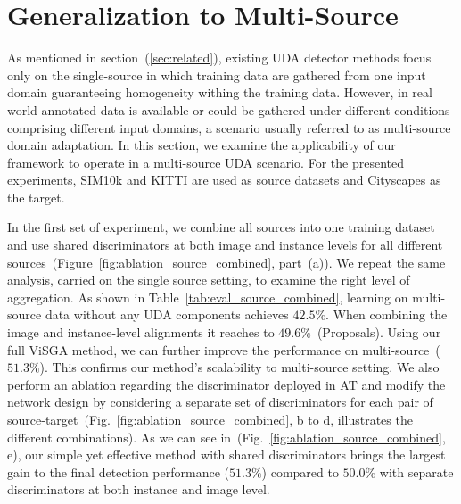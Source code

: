 \documentclass[10pt,twocolumn,letterpaper]{article}
\def\ourda{ViSGA\xspace}
\begin{document}
 











 


\section{Generalization to Multi-Source}
\label{sec:generalization}


As mentioned in section~(\ref{sec:related}), existing UDA detector methods focus only on the single-source in which training data are gathered from one input domain guaranteeing homogeneity withing the training data. However, in real world annotated data is available or could be gathered under different conditions comprising different input domains, a scenario usually referred to as multi-source domain adaptation. In this section, we examine the applicability of our framework to operate in a multi-source UDA scenario. For the presented experiments, SIM10k and KITTI are used as source datasets and Cityscapes as the target. 

In the first set of experiment, we combine all sources into one training dataset and use shared discriminators at both image and instance levels for all different sources~(Figure~\ref{fig:ablation_source_combined}, part~(a)). We repeat the same analysis, carried on the single source setting, to examine the right level of aggregation. As shown in Table~\ref{tab:eval_source_combined}, learning on multi-source data without any UDA components achieves $42.5\%$.  When combining the image and instance-level alignments it reaches to $49.6\%$~(Proposals). Using our full \ourda method, we can further improve the performance on multi-source~($51.3\%$). This confirms our method's scalability to multi-source setting. We also perform an ablation regarding the discriminator deployed in AT and modify the network design by 
considering a separate set of discriminators for each pair of source-target~(Fig.~\ref{fig:ablation_source_combined}, b to d, illustrates the different combinations).  
As we can see in~(Fig.~\ref{fig:ablation_source_combined}, e), our simple yet effective method with shared discriminators brings the largest gain to the final detection performance ($51.3\%$) compared to $50.0\%$ with separate discriminators at both instance and image level.
\end{document}
